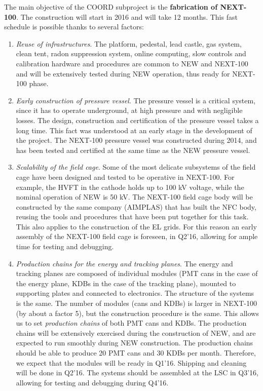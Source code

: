 The main objective of the COORD subproject is the {\bf fabrication of NEXT-100}. The construction will start in 2016 and will take 12 months. This fast schedule is possible thanks to several factors:
%
\begin{enumerate}
\item {\em Reuse of infrastructures}.
The platform, pedestal, lead castle, gas system, clean tent, radon suppression system, online computing, slow controls and calibration hardware and procedures are common to NEW and NEXT-100 and will be extensively tested during NEW operation, thus ready for NEXT-100 phase.
\item {\em Early construction of pressure vessel}. 
The pressure vessel is a critical system, since it has to operate underground, at high pressure and with negligible losses. The design, construction and certification of the pressure vessel takes a long time. This fact was understood at an early stage in the development of the project. The NEXT-100 pressure vessel was constructed during 2014, and has been tested and certified at the same time as the NEW pressure vessel. 
\item {\em Scalability of the field cage}. 
Some of the most delicate subsystems of the field cage have been designed and tested to be operative in NEXT-100. For example, the HVFT in the cathode holds up to 100 kV voltage, while the nominal operation of NEW is 50 kV. The NEXT-100 field cage body will be constructed by the same company (AIMPLAS) that has built the NFC body, reusing the tools and procedures that have been put together for this task. This also applies to the construction of the EL grids. For this reason an early assembly of the NEXT-100 field cage is foreseen, in Q2'16, allowing for ample time for testing and debugging.

\item {\em Production chains for the energy and tracking planes}. 
The energy and tracking planes are composed of individual modules (PMT cans in the case of the energy plane, KDBs in the case of the tracking plane), mounted to supporting plates and connected to electronics. The structure of the systems is the same. The number of modules (cans and KDBs) is larger in NEXT-100 (by about a factor 5), but the construction procedure is the same. This allows us to set {\em production chains} of both PMT cans and KDBs. The production chains will be extensively exercised during the construction of NEW, and are expected to run smoothly during NEW construction. The production chains should be able to produce 20 PMT cans and 30 KDBs per month. Therefore, we expect that the modules will be ready in Q1'16. Shipping and cleaning will be done in Q2'16. The systems should be assembled at the LSC in Q3'16, allowing for testing and debugging during Q4'16.
\end{enumerate}